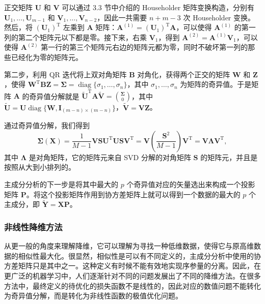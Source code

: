 正交矩阵 $\mathbf U$ 和 $\mathbf V$ 可以通过 3.3 节中介绍的 Householder 矩阵变换构造，分别有 $\mathbf U_1,\ldots,\mathbf U_{m-1}$ 和 $\mathbf V_1,\ldots,\mathbf V_{n-2}$，因此一共需要 $n+m-3$ 次 Householder 变换。然后，将 $(\mathbf U_1)^\mathrm T$ 左乘到 $\mathbf A$ 矩阵：$\mathbf A^{(1)}=(\mathbf U_1)^\mathrm T\mathbf A$，可以使得 $\mathbf A^{(1)}$ 的第一列的第二个矩阵元以下都是零。接下来，右乘 $\mathbf V_1$，得到 $\mathbf A^{(2)}=\mathbf A^{(1)}\mathbf V_1$，可以使得 $\mathbf A^{(2)}$ 第一行的第三个矩阵元右边的矩阵元都为零，同时不破坏第一列的那些已经化为零的矩阵元。

第二步，利用 QR 迭代将上双对角矩阵 $\mathbf B$ 对角化，获得两个正交的矩阵 $\mathbf W$ 和 $\mathbf Z$，使得 $\mathbf W^{\mathrm T}\mathbf B\mathbf Z=\bm\Sigma=\operatorname{diag}\{\sigma_1,\ldots,\sigma_n\}$，其中 $\sigma_1,\ldots,\sigma_n$ 为矩阵的奇异值。于是矩阵 $\mathbf A$ 的奇异值分解就是 $\widetilde{\mathbf U}^{\mathrm T}\mathbf A\widetilde{\mathbf V}=\binom{\bm\Sigma}{0}$，其中 $\widetilde{\mathbf U}=\mathbf U\operatorname{diag}\{\mathbf W,\mathbf I_{(m-n)\times(m-n)}\}$，$\widetilde{\mathbf V}=\mathbf V\mathbf Z$。

通过奇异值分解，我们得到
\begin{equation}
\bm\Sigma(\mathbf X)=\frac1{M-1}\mathbf V\mathbf S\mathbf U^{\mathrm T}\mathbf U\mathbf S\mathbf V^{\mathrm T}
=\mathbf V\left(\frac{\mathbf S^2}{M-1}\right)\mathbf V^{\mathrm T}=\mathbf V\bm\Lambda\mathbf V^{\mathrm T},
\tag{8.2.4}
\end{equation}
其中 $\bm\Lambda$ 是对角矩阵，它的矩阵元来自 SVD 分解的对角矩阵 $\mathbf S$ 的矩阵元，并且是按照从大到小排列的。

主成分分析的下一步是将其中最大的 $p$ 个奇异值对应的矢量选出来构成一个投影矩阵 $\mathbf P$。将这个投影矩阵作用到协方差矩阵上就可以得到一个数据的最大的 $p$ 个主成分，即 $\widetilde{\mathbf Y}=\mathbf X\mathbf P$。

\subsubsection{非线性降维方法}
从更一般的角度来理解降维，它可以理解为寻找一种低维数据，使得它与原高维数据的相似性最大化。很显然，相似性是可以有不同定义的，主成分分析中使用的协方差矩阵只是其中之一。这种定义有时候不能有效地实现序参量的分离。因此，在更广泛的机器学习中，人们逐渐针对不同的问题发展出了不同的降维方法。在很多方法中，最终定义的待优化的损失函数不是线性的，因此对应的数值问题不能转化为奇异值分解，而是转化为非线性函数的极值优化问题。

